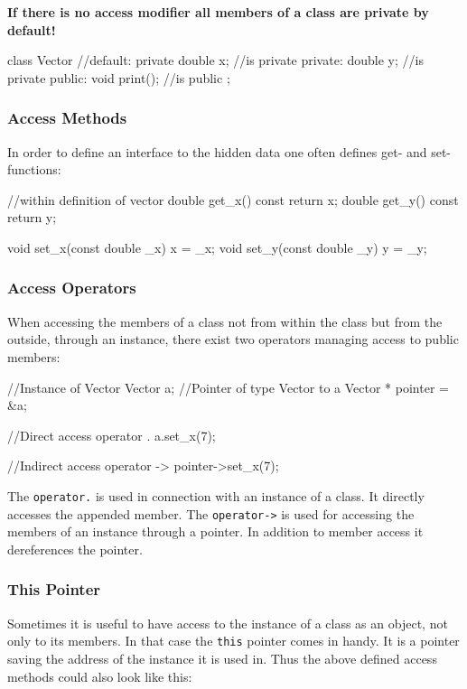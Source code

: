 \documentclass[10pt,a4paper]{scrartcl}
\begin{document}
\begin{multicols*}{2}
\textbf{If there is no access modifier all members of a class are private by default!}

\begin{TPCpp}
class Vector {
	//default: private
	double x; //is private
private: 
	double y; //is private
public:
	void print(); //is public
};
\end{TPCpp}

\subsubsection{Access Methods}
\label{sec:AccessMethods}

In order to define an interface to the hidden data one often defines get- and set-functions:

\begin{TPCpp}
	//within definition of vector
	double get_x() const {return x;}
	double get_y() const {return y;}
	
	void set_x(const double _x) {x = _x;}
	void set_y(const double _y) {y = _y;}
\end{TPCpp}

\subsubsection{Access Operators}
\label{sec:AccessOperators}

When accessing the members of a class not from within the class but from the outside, through an instance, there exist two operators managing access to public members:

\begin{TPCpp}
//Instance of Vector
Vector a;
//Pointer of type Vector to a
Vector * pointer = &a;

//Direct access operator .
a.set_x(7);

//Indirect access operator ->
pointer->set_x(7);
\end{TPCpp}

The \verb+operator.+ is used in connection with an instance of a class. It directly accesses the appended member. The \verb+operator->+ is used for accessing the members of an instance through a pointer. In addition to member access it dereferences the pointer.

\subsubsection{This Pointer}
\label{sec:ThisPointer}

Sometimes it is useful to have access to the instance of a class as an object, not only to its members. In that case the \verb+this+ pointer comes in handy. It is a pointer saving the address of the instance it is used in. Thus the above defined access methods could also look like this:


\end{multicols*}
\end{document}
